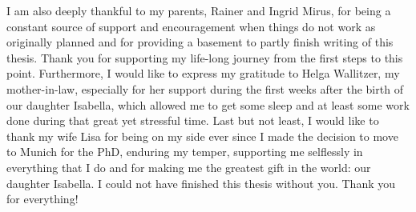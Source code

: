 I am also deeply thankful to my parents, Rainer and Ingrid Mirus, for being a constant source of support and encouragement when things do not work as originally planned and for providing a basement to partly finish writing of this thesis.
Thank you for supporting my life-long journey from the first steps to this point.
Furthermore, I would like to express my gratitude to Helga Wallitzer, my mother-in-law, especially for her support during the first weeks after the birth of our daughter Isabella, which allowed me to get some sleep and at least some work done during that great yet stressful time.
Last but not least, I would like to thank my wife Lisa for being on my side ever since I made the decision to move to Munich for the PhD, enduring my temper, supporting me selflessly in everything that I do and for making me the greatest gift in the world: our daughter Isabella.
I could not have finished this thesis without you.
Thank you for everything! 

